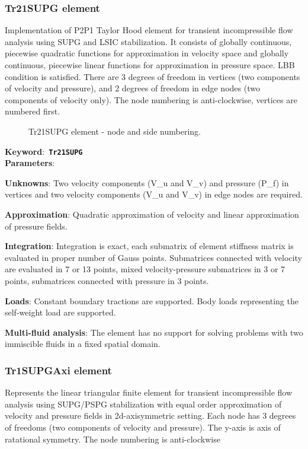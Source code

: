 \documentclass[a4paper]{article}
\newcommand{\descitem}[1]{{\noindent \bf #1}:}
\newcommand{\elemkeyword}[1]{\descitem{Keyword}~{\bf \texttt{#1}}}
\begin{document}
\subsubsection{Tr21SUPG element}
\label{Tr21SUPG}
Implementation of P2P1 Taylor Hood element for transient incompressible flow analysis 
using SUPG and LSIC stabilization. It consists of globally continuous, piecewise quadratic functions for 
approximation in velocity space and globally continuous, piecewise linear functions for
approximation in pressure space. LBB condition is satisfied. There are 3 degrees
of freedom in vertices (two components of velocity and pressure), and 2 degrees of freedom
in edge nodes (two components of velocity only).
The node numbering is anti-clockwise, vertices are numbered first.

\begin{figure}[htb]
 \centering
 \begin{makeimage}
  
 \end{makeimage}
 \caption{Tr21SUPG element - node and side numbering.}
 \label{Tr21SUPGfig}
\end{figure}

\elemkeyword{Tr21SUPG}\\
\descitem{Parameters}

\descitem{Unknowns}
Two velocity components (V\_u and V\_v) and pressure (P\_f) in vertices and two velocity components (V\_u and V\_v) in edge nodes are required.

\descitem{Approximation} Quadratic approximation of velocity and linear approximation of pressure fields.

\descitem{Integration}
Integration is exact, each submatrix of element stiffness matrix is evaluated in proper number of
Gauss points. Submatrices connected with velocity are evaluated in 7 or 13 points, mixed velocity-pressure
submatrices in 3 or 7 points, submatrices connected with pressure in 3 points.

\descitem{Loads} Constant boundary tractions are supported. Body loads
representing the self-weight load are supported.

\descitem{Multi-fluid analysis} The element has no support for solving
problems with two immiscible fluids in a fixed spatial domain.

\subsubsection{Tr1SUPGAxi element}
\label{Tr1SUPGAxi}
Represents the linear triangular finite element for transient
incompressible flow analysis using SUPG/PSPG stabilization with equal order
approximation of velocity and pressure fields in 2d-axisymmetric setting. Each node has 3 degrees
of freedoms (two components of velocity and pressure). The y-axis is
axis of ratational symmetry. The node numbering is anti-clockwise
\end{document}
